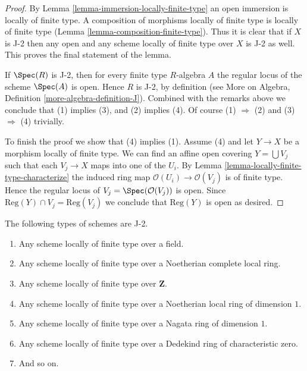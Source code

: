 \begin{proof}
By Lemma \ref{lemma-immersion-locally-finite-type} an open immersion
is locally of finite type. A composition of morphisms locally of
finite type is locally of finite type
(Lemma \ref{lemma-composition-finite-type}). Thus it is clear that if $X$ is
J-2 then any open and any scheme locally of finite
type over $X$ is J-2 as well. This proves the final
statement of the lemma.

\medskip\noindent
If $\Spec(R)$ is J-2, then for every finite type $R$-algebra $A$
the regular locus of the scheme $\Spec(A)$ is open. Hence $R$ is
J-2, by definition (see
More on Algebra, Definition \ref{more-algebra-definition-J}).
Combined with the remarks above we conclude that (1) implies (3), and
(2) implies (4). Of course (1) $\Rightarrow$ (2) and
(3) $\Rightarrow$ (4) trivially.

\medskip\noindent
To finish the proof we show that (4) implies (1).
Assume (4) and let $Y \to X$ be a morphism locally of finite type.
We can find an affine open covering $Y = \bigcup V_j$ such that
each $V_j \to X$ maps into one of the $U_i$. By
Lemma \ref{lemma-locally-finite-type-characterize}
the induced ring map $\mathcal{O}(U_i) \to \mathcal{O}(V_j)$ is
of finite type. Hence the regular locus of
$V_j = \Spec(\mathcal{O}(V_j))$ is open. Since
$\text{Reg}(Y) \cap V_j = \text{Reg}(V_j)$ we conclude that
$\text{Reg}(Y)$ is open as desired.
\end{proof}

\begin{lemma}
\label{lemma-ubiquity-J-2}
The following types of schemes are J-2.
\begin{enumerate}
\item Any scheme locally of finite type over a field.
\item Any scheme locally of finite type over a Noetherian complete local ring.
\item Any scheme locally of finite type over $\mathbf{Z}$.
\item Any scheme locally of finite type over a Noetherian local ring
of dimension $1$.
\item Any scheme locally of finite type over a Nagata ring of dimension $1$.
\item Any scheme locally of finite type over a Dedekind ring of
characteristic zero.
\item And so on.
\end{enumerate}
\end{lemma}

